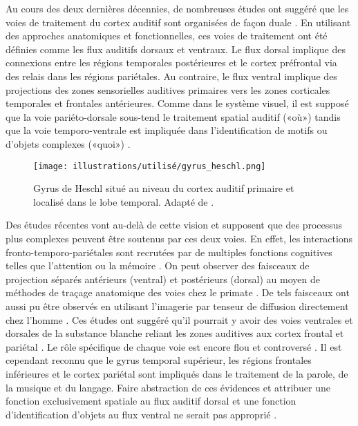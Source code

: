 Au cours des deux dernières décennies, de nombreuses études ont suggéré que les voies de traitement du cortex auditif sont organisées de façon duale \citep{ahveninen2006task, alain2001and, albouy2013behavioral, altmann2007processing, 
anourova2001evidence, belin2000voice, bidet2005dynamics, bushara1999modality, clarke2005and, garell2013functional, rauschecker1998cortical, rauschecker2009maps, recanzone2011perception, tardif2008interactions, zatorre2004sensitivity}. 
En utilisant des approches anatomiques et fonctionnelles, ces voies de traitement ont été définies comme les flux auditifs dorsaux et ventraux. 
Le flux dorsal implique des connexions entre les régions temporales postérieures et le cortex préfrontal via des relais dans les régions pariétales. 
Au contraire, le flux ventral implique des projections des zones sensorielles auditives primaires vers les zones corticales temporales et frontales antérieures. 
Comme dans le système visuel, il est supposé que la voie pariéto-dorsale sous-tend le traitement spatial auditif («où») tandis que la voie temporo-ventrale est impliquée dans l'identification de motifs ou d'objets complexes («quoi») \citep{kaas1999and, rauschecker2009maps}. 

\begin{figure*}[!t]
\center
\texttt{[image: illustrations/utilisé/gyrus\_heschl.png]}
\caption[Gyrus de Heschl]{Gyrus de Heschl situé au niveau du cortex auditif primaire et localisé dans le lobe temporal. Adapté de \cite{friederici2011brain}.}
\label{fig:chap2gyrusheschl}
\end{figure*}

Des études récentes vont au-delà de cette vision et supposent que des processus plus complexes peuvent être soutenus par ces deux voies. 
En effet, les interactions fronto-temporo-pariétales sont recrutées par de multiples fonctions cognitives telles que l'attention ou la mémoire \citep{naghavi2005common}. 
On peut observer des faisceaux de projection séparés antérieurs (ventral) et postérieurs (dorsal) au moyen de méthodes de traçage anatomique des voies chez le primate \citep{kaas1999and, rauschecker1997serial, romanski1999auditory}. 
De tels faisceaux ont aussi pu être observés en utilisant l'imagerie par tenseur de diffusion directement chez l'homme \citep{catani2008diffusion, frey2008dissociating}. 
Ces études ont suggéré qu'il pourrait y avoir des voies ventrales et dorsales de la substance blanche reliant les zones auditives aux cortex frontal et pariétal \citep{catani2008diffusion, croxson2005quantitative, frey2008dissociating}. 
Le rôle spécifique de chaque voie est encore flou et controversé \citep{albouy2013behavioral, rauschecker2009maps}. 
Il est cependant reconnu que le gyrus temporal supérieur, les régions frontales inférieures et le cortex pariétal sont impliqués dans le traitement de la parole, de la musique et du langage. 
Faire abstraction de ces évidences et attribuer une fonction exclusivement spatiale au flux auditif dorsal et une fonction d'identification d'objets au flux ventral ne serait pas approprié \citep{rauschecker2009maps}. 

